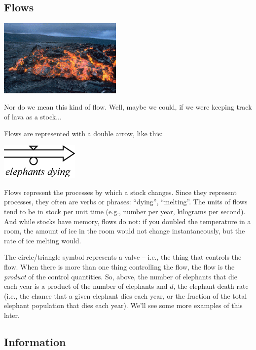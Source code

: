 \subsection{Flows}

\begin{marginfigure}
\includegraphics[width=6cm]{figs/lavaflow}
\caption{Nor do we mean this kind of flow. Well, maybe we could, if we were keeping track of lava as a stock...}
\end{marginfigure}
Flows are represented with a double arrow, like this:

\beforefig
\centerline{\includegraphics[height=.4in]{figs/Flow}}
\afterfig


Flows represent the processes by which a stock changes.  Since they represent processes, they often are verbs or phrases:  ``dying'', ``melting''.  The units of flows tend to be in stock per unit time (e.g., number per year, kilograms per second).  And while stocks have memory, flows do not: if you doubled the temperature 
in a room, the amount of ice in the room would not change instantaneously, but the rate of ice melting would.  

The circle/triangle symbol represents a valve -- i.e., the thing that controls the flow.  When there is more than one thing controlling the flow, the flow is the {\em product} of the control quantities.  So, above, the number of elephants that die each year is a product of the number of elephants and $d$, the elephant death rate (i.e., the chance that a given elephant dies each year, or the fraction of the total elephant population that dies each year).  We'll see some more examples of this later.


\subsection{Information}

